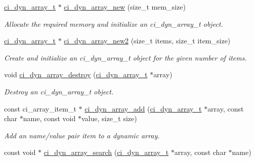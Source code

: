 \begin{DoxyCompactItemize}
\item 
\hyperlink{group__DYNAMIC__ARRAYS_ga26fd79bb931b37f9c02deca8da6fe638}{ci\_\-dyn\_\-array\_\-t} $\ast$ \hyperlink{group__DYNAMIC__ARRAYS_ga1e963c7154158e101bebe374ff6ccb8b}{ci\_\-dyn\_\-array\_\-new} (size\_\-t mem\_\-size)
\begin{DoxyCompactList}\small\item\em Allocate the required memory and initialize an ci\_\-dyn\_\-array\_\-t object. \item\end{DoxyCompactList}\item 
\hyperlink{group__DYNAMIC__ARRAYS_ga26fd79bb931b37f9c02deca8da6fe638}{ci\_\-dyn\_\-array\_\-t} $\ast$ \hyperlink{group__DYNAMIC__ARRAYS_ga94c47c0e9552dd8f45b47b91e09de2b9}{ci\_\-dyn\_\-array\_\-new2} (size\_\-t items, size\_\-t item\_\-size)
\begin{DoxyCompactList}\small\item\em Create and initialize an ci\_\-dyn\_\-array\_\-t object for the given number of items. \item\end{DoxyCompactList}\item 
void \hyperlink{group__DYNAMIC__ARRAYS_gab25a8dc94700a06da76b8fa7d0f0c89f}{ci\_\-dyn\_\-array\_\-destroy} (\hyperlink{group__DYNAMIC__ARRAYS_ga26fd79bb931b37f9c02deca8da6fe638}{ci\_\-dyn\_\-array\_\-t} $\ast$array)
\begin{DoxyCompactList}\small\item\em Destroy an ci\_\-dyn\_\-array\_\-t object. \item\end{DoxyCompactList}\item 
const ci\_\-array\_\-item\_\-t $\ast$ \hyperlink{group__DYNAMIC__ARRAYS_gacda11afc2e4648980feb3b807d62bde3}{ci\_\-dyn\_\-array\_\-add} (\hyperlink{group__DYNAMIC__ARRAYS_ga26fd79bb931b37f9c02deca8da6fe638}{ci\_\-dyn\_\-array\_\-t} $\ast$array, const char $\ast$name, const void $\ast$value, size\_\-t size)
\begin{DoxyCompactList}\small\item\em Add an name/value pair item to a dynamic array. \item\end{DoxyCompactList}\item 
const void $\ast$ \hyperlink{group__DYNAMIC__ARRAYS_gaa2a9f363adbac9d2fcf535fa913a6177}{ci\_\-dyn\_\-array\_\-search} (\hyperlink{group__DYNAMIC__ARRAYS_ga26fd79bb931b37f9c02deca8da6fe638}{ci\_\-dyn\_\-array\_\-t} $\ast$array, const char $\ast$name)

\end{DoxyCompactItemize}
